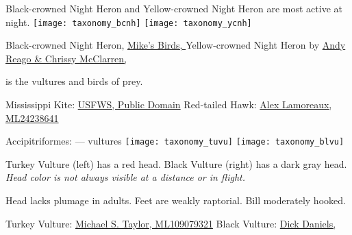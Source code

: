 \documentclass[t]{beamer}
\begin{document}
\begin{frame}{Black-crowned Night Heron and Yellow-crowned Night Heron are most active at night.}
\texttt{[image: taxonomy\_bcnh]} \hfill
\texttt{[image: taxonomy\_ycnh]}

\vfilll

\tiny Black-crowned Night Heron, \href{https://flickr.com/photos/pazzani/6021109879}{Mike's Birds, } \hfill Yellow-crowned Night Heron by \href{https://flickr.com/photos/wildreturn/51220695991}{Andy Reago \& Chrissy McClarren, }
\end{frame}

{

\begin{frame}{ is the vultures and birds of prey.}



\vfilll

\tiny Mississippi Kite: \href{https://www.flickr.com/photos/usfws_southwest/34756619865}{USFWS, Public Domain} \hfill Red-tailed Hawk: \href{https://macaulaylibrary.org/asset/24238641}{Alex Lamoreaux, ML24238641}
\end{frame}
}


\begin{frame}{Accipitriformes:  — vultures}
\texttt{[image: taxonomy\_tuvu]}\hfill
\texttt{[image: taxonomy\_blvu]}

Turkey Vulture (left) has a red head. Black Vulture (right) has a dark gray head. \emph{Head color is not always visible at a distance or in flight.}

\vspace{0.5\baselineskip}

Head lacks plumage in adults. Feet are weakly raptorial. Bill moderately hooked.

\vfilll

\tiny Turkey Vulture:   \href{https://macaulaylibrary.org/asset/109079321}{Michael S. Taylor, ML109079321}\hfill
Black Vulture: \href{https://commons.wikimedia.org/wiki/File:Vulture,_Black_FG1.jpg}{Dick Daniels, }
\end{frame}
\end{document}
